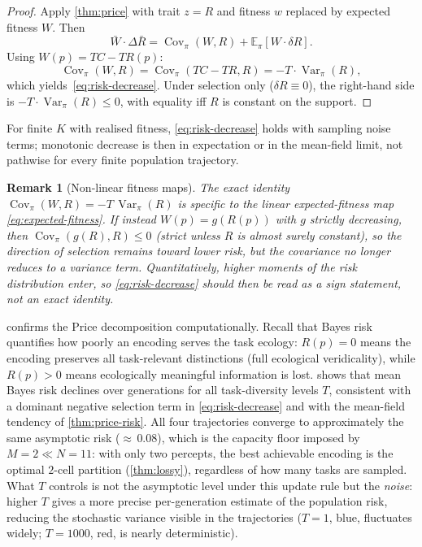 \documentclass[12pt]{article}
\newtheorem{remark}[theorem]{Remark}
\newcommand{\Rbar}{\bar{R}}
\newcommand{\Wbar}{\bar{W}}
\newcommand{\E}{\mathbb{E}}
\newcommand{\Var}{\operatorname{Var}}
\newcommand{\Cov}{\operatorname{Cov}}
\begin{document}
\begin{proof}
Apply \cref{thm:price} with trait $z = R$ and fitness $w$ replaced by expected fitness $W$. Then
\[
\Wbar \cdot \Delta \Rbar = \Cov_\pi(W, R) + \E_\pi[W \cdot \delta R].
\]
Using $W(p) = TC - TR(p)$:
\[
\Cov_\pi(W, R) = \Cov_\pi(TC - TR, R) = -T \cdot \Var_\pi(R),
\]
which yields~\eqref{eq:risk-decrease}. Under selection only ($\delta R \equiv 0$), the right-hand side is $-T \cdot \Var_\pi(R) \le 0$, with equality iff $R$ is constant on the support.
\end{proof}

For finite $K$ with realised fitness, \eqref{eq:risk-decrease} holds with sampling noise terms; monotonic decrease is then in expectation or in the mean-field limit, not pathwise for every finite population trajectory.

\begin{remark}[Non-linear fitness maps]
The exact identity $\Cov_\pi(W, R) = -T\,\Var_\pi(R)$ is specific to the linear expected-fitness map \eqref{eq:expected-fitness}. If instead $W(p) = g(R(p))$ with $g$ strictly decreasing, then $\Cov_\pi(g(R), R) \le 0$ (strict unless $R$ is almost surely constant), so the \emph{direction} of selection remains toward lower risk, but the covariance no longer reduces to a variance term. Quantitatively, higher moments of the risk distribution enter, so \eqref{eq:risk-decrease} should then be read as a sign statement, not an exact identity.
\end{remark}

 confirms the Price decomposition computationally. Recall that Bayes risk quantifies how poorly an encoding serves the task ecology: $R(p) = 0$ means the encoding preserves all task-relevant distinctions (full ecological veridicality), while $R(p) > 0$ means ecologically meaningful information is lost.  shows that mean Bayes risk declines over generations for all task-diversity levels $T$, consistent with a dominant negative selection term in \eqref{eq:risk-decrease} and with the mean-field tendency of \cref{thm:price-risk}. All four trajectories converge to approximately the same asymptotic risk (${\approx}\,0.08$), which is the capacity floor imposed by $M = 2 \ll N = 11$: with only two percepts, the best achievable encoding is the optimal $2$-cell partition (\cref{thm:lossy}), regardless of how many tasks are sampled. What $T$ controls is not the asymptotic level under this update rule but the \emph{noise}: higher $T$ gives a more precise per-generation estimate of the population risk, reducing the stochastic variance visible in the trajectories ($T=1$, blue, fluctuates widely; $T=1000$, red, is nearly deterministic).
\end{document}
